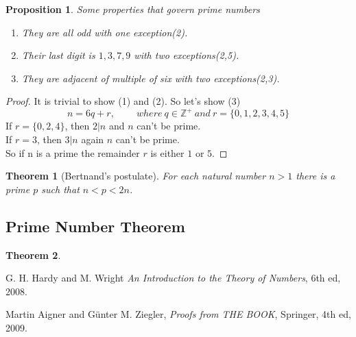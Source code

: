 \documentclass[a4paper,draft]{amsproc}
\theoremstyle{plain}
\newtheorem{thm}{Theorem}[section]
\newtheorem{prop}{Proposition}[section]
\theoremstyle{definition}
\theoremstyle{remark}
\numberwithin{equation}{section}
\begin{document}
\begin{prop}
Some properties that govern prime numbers
\begin{enumerate}
  \item They are all odd with one exception(2).
  \item Their last digit is $1,3,7,9$ with two exceptions(2,5).
  \item They are adjacent of multiple of six with two exceptions(2,3).
\end{enumerate}

\end{prop}
\begin{proof}
It is trivial to show (1) and (2). So let's show (3)
$$ n=6q+r, \qquad ~where~ q\in \mathbb{Z}^+ ~and ~r=\{0,1,2,3,4,5\}$$
If $r=\{0,2,4\}$, then $2|n$ and $n$ can't be prime.\\
If $r=3$, then $3|n$ again $n$ can't be prime.\\
So if n is a prime the remainder $r$ is either $1$ or $5$.
\end{proof}


\begin{thm}[Bertnand’s postulate]
For each natural number $n>1$  there is a prime $p$ such that $n<p<2n$.
\end{thm}
\subsection{Prime Number Theorem}
\begin{thm}

\end{thm}


\begin{thebibliography}{n} %

\label{some label - optional} G. H. Hardy and M. Wright
\emph{An Introduction to  the  Theory of Numbers},
6th ed, 2008.

 Martin Aigner and G\"{u}nter M. Ziegler,
\emph{Proofs from THE BOOK}, Springer, 4th ed, 2009.

\end{thebibliography}
\end{document}
